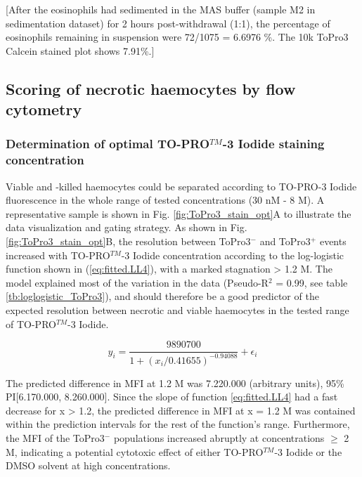 [After the eosinophils had sedimented in the MAS buffer (sample M2 in sedimentation dataset) for 2 hours post-withdrawal (1:1), the percentage of eosinophils remaining in suspension were 72/1075 = 6.6976 \%. The 10k ToPro3 Calcein stained plot shows 7.91\%.]
\newpage



\subsection{Scoring of necrotic haemocytes by flow cytometry}
\subsubsection{Determination of optimal TO-PRO$^{TM}$-3 Iodide staining concentration}
Viable and -killed haemocytes could be separated according to TO-PRO-3 Iodide fluorescence in the whole range of tested concentrations (30 nM - 8 \micro M). A representative sample is shown in Fig. \ref{fig:ToPro3_stain_opt}A to illustrate the data visualization and gating strategy. As shown in Fig. \ref{fig:ToPro3_stain_opt}B, the resolution between ToPro3$^{-}$ and ToPro3$^{+}$ events increased with TO-PRO$^{TM}$-3 Iodide concentration according to the log-logistic function shown in (\ref{eq:fitted.LL4}), with a marked stagnation > 1.2 \micro M. The model explained most of the variation in the data (Pseudo-R$^{2}$ = 0.99, see table \ref{tb:loglogistic_ToPro3}), and should therefore be a good predictor of the expected resolution between necrotic and viable haemocytes in the tested range of TO-PRO$^{TM}$-3 Iodide.

\begin{equation}
\label{eq:fitted.LL4}
y_{i} = \dfrac{9890700}{1 + (x_i / 0.41655)^{-0.94088}} + \epsilon_i
\end{equation}

The predicted difference in MFI at 1.2 \micro M was 7.220.000 (arbitrary units), 95\% PI[6.170.000, 8.260.000]. Since the slope of function \ref{eq:fitted.LL4} had a fast decrease for x > 1.2, the predicted difference in MFI at x = 1.2 \micro M was contained within the prediction intervals for the rest of the function's range. Furthermore, the MFI of the ToPro3$^{-}$ populations increased abruptly at concentrations $\geq$ 2 \micro M, indicating a potential cytotoxic effect of either TO-PRO$^{TM}$-3 Iodide or the DMSO solvent at high concentrations.


